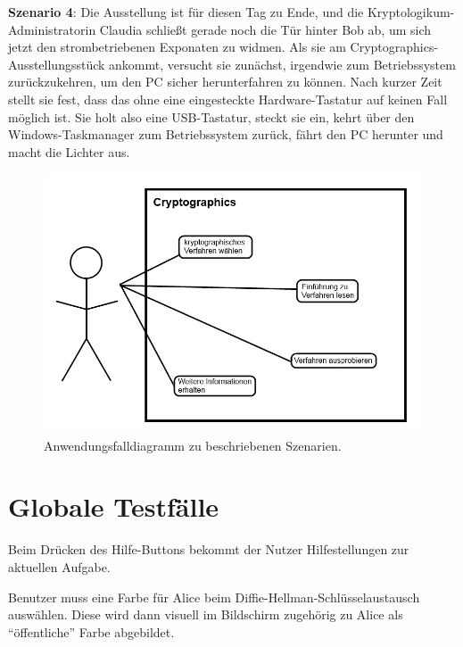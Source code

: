 \documentclass{article}
\begin{document}
\textbf{Szenario 4}:
Die Ausstellung ist für diesen Tag zu Ende, und die Kryptologikum-Administratorin Claudia schließt gerade noch die Tür hinter Bob ab, um sich jetzt den strombetriebenen Exponaten zu widmen. Als sie am \gls{Cryptographics}-Ausstellungsstück ankommt, versucht sie zunächst, irgendwie zum Betriebssystem zurückzukehren, um den PC sicher herunterfahren zu können. Nach kurzer Zeit stellt sie fest, dass das ohne eine eingesteckte Hardware-Tastatur auf keinen Fall möglich ist. Sie holt also eine USB-Tastatur, steckt sie ein, kehrt über den Windows-Taskmanager zum Betriebssystem zurück, fährt den PC herunter und macht die Lichter aus.\\

\begin{figure}[H]
  \centering
    \includegraphics[width=\textwidth]{resources/usecase1}
  \caption{Anwendungsfalldiagramm zu beschriebenen Szenarien.}
\end{figure}

\section{Globale Testfälle}
\begin{T}[start = 10]
\item Beim Drücken des Hilfe-Buttons bekommt der Nutzer Hilfestellungen zur aktuellen Aufgabe.
\end{T}

\begin{T}[start = 20]
 \item Benutzer muss eine Farbe für Alice beim Diffie-Hellman-Schlüsselaustausch auswählen. Diese wird dann visuell im Bildschirm zugehörig zu Alice als ``öffentliche'' Farbe abgebildet.
\end{T}
\end{document}
